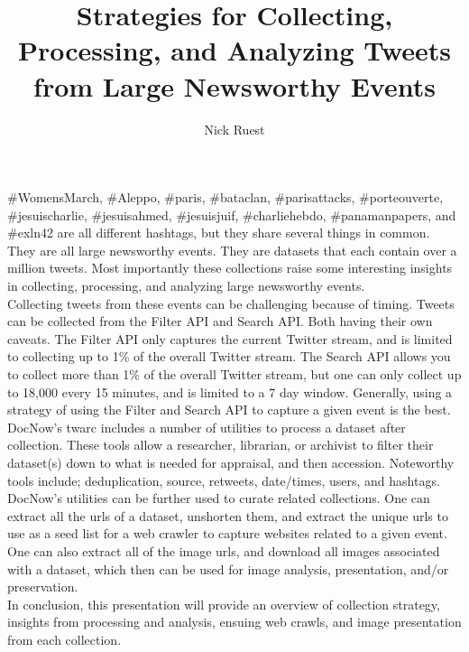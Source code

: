 \documentclass[sigconf]{acmart}
\begin{document}
\title{Strategies for Collecting, Processing, and Analyzing Tweets from Large Newsworthy Events}

\author{Nick Ruest}



\maketitle

\#WomensMarch, \#Aleppo, \#paris, \#bataclan, \#parisattacks, \#porteouverte, \#jesuischarlie, \#jesuisahmed, \#jesuisjuif, \#charliehebdo, \#panamanpapers, and \#exln42 are all different hashtags, but they share several things in common. They are all large newsworthy events. They are datasets that each contain over a million tweets. Most importantly these collections raise some interesting insights in collecting, processing, and analyzing large newsworthy events\cite{Milligan_etal_JCDL2016}.\\
 
Collecting tweets from these events can be challenging because of timing. Tweets can be collected from the Filter API\cite{twitter_filter} and Search API\cite{twitter_search}. Both having their own caveats. The Filter API only captures the current Twitter stream, and is limited to collecting up to 1\% of the overall Twitter stream. The Search API allows you to collect more than 1\% of the overall Twitter stream\cite{Driscoll_etal_IJC2014}, but one can only collect up to 18,000 every 15 minutes, and is limited to a 7 day window. Generally, using a strategy of using the Filter and Search API to capture a given event is the best.\\
 
DocNow's twarc\cite{summers_twarc_2015} includes a number of utilities to process a dataset after collection. These tools allow a researcher, librarian, or archivist to filter their dataset(s) down to what is needed for appraisal, and then accession. Noteworthy tools include; deduplication, source, retweets, date/times, users, and hashtags.\\
 
DocNow's utilities can be further used to curate related collections. One can extract all the urls of a dataset, unshorten them, and extract the unique urls to use as a seed list for a web crawler to capture websites related to a given event. One can also extract all of the image urls, and download all images associated with a dataset, which then can be used for image analysis\cite{ruest_2016}, presentation, and/or preservation.\\
 
In conclusion, this presentation will provide an overview of collection strategy, insights from processing and analysis, ensuing web crawls, and image presentation from each collection.\\


 
\end{document}
